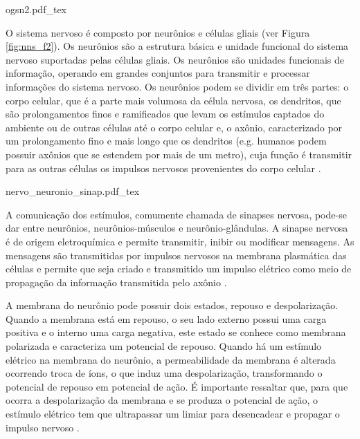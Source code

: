 \begin{figure*}
    \centering %
    \small %
    \def\svgwidth{0.9\columnwidth}%
    {ogsn2.pdf_tex}
    \caption{Organização geral do sistema nervoso.}
    \label{fig:ogsn_f1}
\end{figure*}

O sistema nervoso é composto por neurônios e células gliais (ver Figura \ref{fig:nns_f2}). Os neurônios são a estrutura básica e unidade funcional do sistema nervoso suportadas pelas células gliais. Os neurônios são unidades funcionais de informação, operando em grandes conjuntos para transmitir e processar informações do sistema nervoso. Os neurônios podem se dividir em três partes: o corpo celular, que é a parte mais volumosa da célula nervosa, os dendritos, que são prolongamentos finos e ramificados que levam os estímulos captados do ambiente ou de outras células até o corpo celular e, o axônio, caracterizado por um prolongamento fino e mais longo que os dendritos (e.g. humanos podem possuir axônios que se estendem por mais de um metro), cuja função é transmitir para as outras células os impulsos nervosos provenientes do corpo celular \cite{Lent2002CemNeuronios}.


\begin{figure*}
    \centering %
    \small %
    \def\svgwidth{1\columnwidth}%
    {nervo_neuronio_sinap.pdf_tex}
    \caption{Ilustração de um nervo, neurônio e sinapses (adaptado de \cite{Fonseca2015InstrumentacaoMedular}).}
    \label{fig:nns_f2}
\end{figure*}

A comunicação dos estímulos, comumente chamada de sinapses nervosa, pode-se dar entre neurônios, neurônios-músculos e neurônio-glândulas. A sinapse nervosa é de origem eletroquímica e permite transmitir, inibir ou modificar mensagens. As mensagens são transmitidas por impulsos nervosos na membrana plasmática das células e permite que seja criado e transmitido um impulso elétrico como meio de propagação da informação transmitida pelo axônio \cite{Lent2002CemNeuronios}.

A membrana do neurônio pode possuir dois estados, repouso e despolarização. Quando a membrana está em repouso, o seu lado externo possui uma carga positiva e o interno uma carga negativa, este estado se conhece como membrana polarizada e caracteriza um potencial de repouso. Quando há um estímulo elétrico na membrana do neurônio, a permeabilidade da membrana é alterada ocorrendo troca de íons, o que induz uma despolarização, transformando o potencial de repouso em potencial de ação. É importante ressaltar que, para que ocorra a despolarização da membrana e se produza o potencial de ação, o estímulo elétrico tem que ultrapassar um limiar para desencadear e propagar o impulso nervoso \cite{Lent2002CemNeuronios}.  

